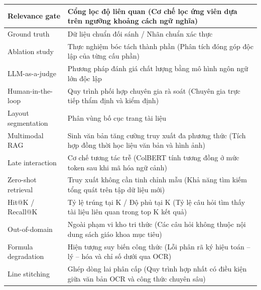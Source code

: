\begin{longtable}{|l|p{9.5cm}|}
    \hline
    Relevance gate & Cổng lọc độ liên quan (Cơ chế lọc ứng viên dựa trên ngưỡng khoảng cách ngữ nghĩa) \\
    \hline
    Ground truth & Dữ liệu chuẩn đối sánh / Nhãn chuẩn xác thực \\
    \hline
    Ablation study & Thực nghiệm bóc tách thành phần (Phân tích đóng góp độc lập của từng cấu phần) \\
    \hline
    LLM-as-a-judge & Phương pháp đánh giá chất lượng bằng mô hình ngôn ngữ lớn độc lập \\
    \hline
    Human-in-the-loop & Quy trình phối hợp chuyên gia rà soát (Chuyên gia trực tiếp thẩm định và kiểm định) \\
    \hline
    Layout segmentation & Phân vùng bố cục trang tài liệu \\
    \hline
    Multimodal RAG & Sinh văn bản tăng cường truy xuất đa phương thức (Tích hợp đồng thời học liệu văn bản và hình ảnh) \\
    \hline
    Late interaction & Cơ chế tương tác trễ (ColBERT tính tương đồng ở mức token sau khi mã hóa ngữ cảnh) \\
    \hline
    Zero-shot retrieval & Truy xuất không cần tinh chỉnh mẫu (Khả năng tìm kiếm tổng quát trên tập dữ liệu mới) \\
    \hline
    Hit@K / Recall@K & Tỷ lệ trúng tại K / Độ phủ tại K (Tỷ lệ câu hỏi tìm thấy tài liệu liên quan trong top K kết quả) \\
    \hline
    Out-of-domain & Ngoài phạm vi kho tri thức (Các câu hỏi không thuộc nội dung sách giáo khoa mục tiêu) \\
    \hline
    Formula degradation & Hiện tượng suy biến công thức (Lỗi phân rã ký hiệu toán -- lý -- hóa và chỉ số dưới qua OCR) \\
    \hline
    Line stitching & Ghép dòng lai phân cấp (Quy trình hợp nhất có điều kiện giữa văn bản OCR và công thức chuyên sâu) \\
    \hline
\end{longtable}